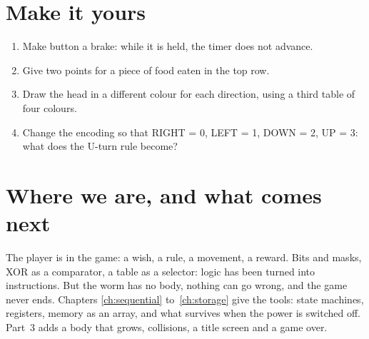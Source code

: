 \section{Make it yours}

\begin{exercise}[on \prg]
\begin{enumerate}[nosep]
\item Make button  a brake: while it is held, the timer does not advance.
\item Give two points for a piece of food eaten in the top row.
\item Draw the head in a different colour for each direction, using a third
  table of four colours.
\item Change the encoding so that RIGHT = 0, LEFT = 1, DOWN = 2, UP = 3: what
  does the U-turn rule become?
\end{enumerate}
\end{exercise}

\section{Where we are, and what comes next}

The player is in the game: a wish, a rule, a movement, a reward. Bits and
masks, XOR as a comparator, a table as a selector: logic has been turned into
instructions. But the worm has no body, nothing can go wrong, and the game
never ends. Chapters \ref{ch:sequential} to~\ref{ch:storage} give the tools:
state machines, registers, memory as an array, and what survives when the
power is switched off. Part~3 adds a body that grows, collisions, a title
screen and a game over.
